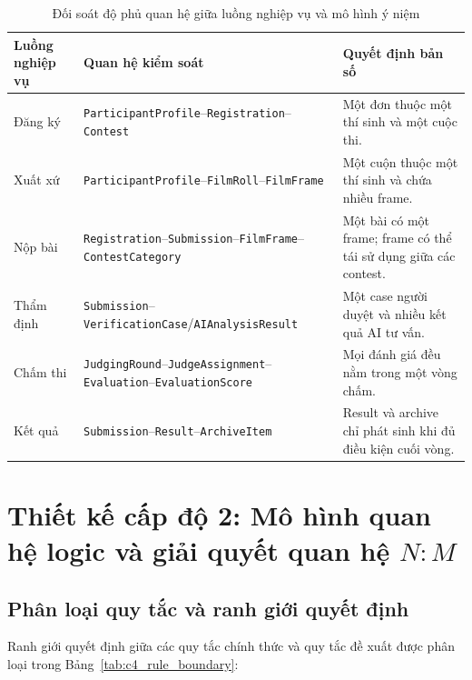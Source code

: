 \begin{table}[!ht]
\centering
\caption{Đối soát độ phủ quan hệ giữa luồng nghiệp vụ và mô hình ý niệm}
\label{tab:c4_relationship_coverage}
\small
\begin{tabularx}{\textwidth}{p{2.2cm}p{4.6cm}>{\raggedright\arraybackslash}X}
\toprule
\textbf{Luồng nghiệp vụ} & \textbf{Quan hệ kiểm soát} & \textbf{Quyết định bản số} \\
\midrule
Đăng ký & \texttt{ParticipantProfile}--\texttt{Registration}--\texttt{Contest} & Một đơn thuộc một thí sinh và một cuộc thi. \\
Xuất xứ & \texttt{ParticipantProfile}--\texttt{FilmRoll}--\texttt{FilmFrame} & Một cuộn thuộc một thí sinh và chứa nhiều frame. \\
Nộp bài & \texttt{Registration}--\texttt{Submission}--\texttt{FilmFrame}--\texttt{ContestCategory} & Một bài có một frame; frame có thể tái sử dụng giữa các contest. \\
Thẩm định & \texttt{Submission}--\texttt{VerificationCase}/\allowbreak\texttt{AIAnalysisResult} & Một case người duyệt và nhiều kết quả AI tư vấn. \\
Chấm thi & \texttt{JudgingRound}--\texttt{JudgeAssignment}--\texttt{Evaluation}--\texttt{EvaluationScore} & Mọi đánh giá đều nằm trong một vòng chấm. \\
Kết quả & \texttt{Submission}--\texttt{Result}--\texttt{ArchiveItem} & Result và archive chỉ phát sinh khi đủ điều kiện cuối vòng. \\
\bottomrule
\end{tabularx}
\end{table}

\section{Thiết kế cấp độ 2: Mô hình quan hệ logic và giải quyết quan hệ \texorpdfstring{$N:M$}{N:M}}
\label{s:c4_logical_model}

\subsection{Phân loại quy tắc và ranh giới quyết định}
Ranh giới quyết định giữa các quy tắc chính thức và quy tắc đề xuất được phân loại trong Bảng~\ref{tab:c4_rule_boundary}:

